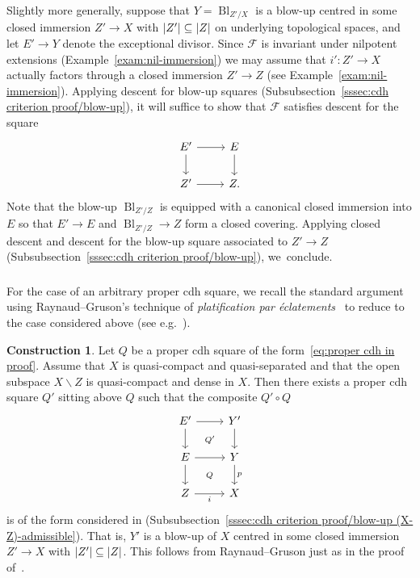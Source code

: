 \documentclass[11pt]{article}
\theoremstyle{definition}
\numberwithin{equation}{section}
\numberwithin{figure}{section}
\numberwithin{table}{section}
\newtheorem{constr}[theo]{Construction}
\DeclarePairedDelimiter\abs{\lvert}{\rvert}
\newcommand{\sF}{\ensuremath{\mathcal{F}}\xspace}
\renewcommand{\setminus}{\smallsetminus}
\DeclareMathOperator{\Bl}{Bl}
\begin{document}
Slightly more generally, suppose that $Y = \Bl_{Z'/X}$ is a blow-up centred in some closed immersion $Z' \to X$ with $\abs{Z'} \subseteq \abs{Z}$ on underlying topological spaces, and let $E' \to Y$ denote the exceptional divisor. Since $\sF$ is invariant under nilpotent extensions (Example~\ref{exam:nil-immersion}) we may assume that $i' : Z' \to X$ actually factors through a closed immersion $Z' \to Z$ (see Example~\ref{exam:nil-immersion}). Applying descent for blow-up squares (Subsubsection~\ref{sssec:cdh criterion proof/blow-up}), it will suffice to show that $\sF$ satisfies descent for the square
\[
\begin{tikzcd}
E' \ar{r}\ar{d} & E \ar{d}
\\
Z' \ar{r} & Z.
\end{tikzcd}
\]
Note that the blow-up $\Bl_{Z'/Z}$ is equipped with a canonical closed immersion into $E$ so that $E' \to E$ and $\Bl_{Z'/Z} \to Z$ form a closed covering. Applying closed descent and descent for the blow-up square associated to $Z' \to Z$ (Subsubsection~\ref{sssec:cdh criterion proof/blow-up}), we~conclude.

\subsubsection{}

For the case of an arbitrary proper cdh square, we recall the standard argument using Raynaud--Gruson's technique of \emph{platification par éclatements}~\cite[I, Corollary~5.7.12]{RaynaudGruson} to reduce to the case considered above (see e.g.~\cite[Subsection~5.2]{KerzStrunkTamme}).

\goodbreak
\begingroup
\begin{constr}\label{constr}
Let $Q$ be a proper cdh square of the form~\eqref{eq:proper cdh in proof}. Assume that $X$ is quasi-compact and quasi-separated and that the open subspace $X\setminus Z$ is quasi-compact and dense in $X$. Then there exists a proper cdh square $Q'$ sitting above $Q$ such that the composite $Q' \circ Q$
\[
\begin{tikzcd}
E' \ar{r}\ar{d}\ar[phantom]{rd}{\scriptstyle Q'} & Y' \ar{d}
\\
E \ar{r}\ar{d}\ar[phantom]{rd}{\scriptstyle Q} & Y \ar{d}{p}
\\
Z \ar[swap]{r}{i} & X
\end{tikzcd}
\]
is of the form considered in (Subsubsection~\ref{sssec:cdh criterion proof/blow-up (X-Z)-admissible}). That is, $Y'$ is a blow-up of $X$ centred in some closed immersion $Z' \to X$ with $\abs{Z'} \subseteq \abs{Z}$. This follows from Raynaud--Gruson just as in the proof of~\cite[Corollary~2.4]{HoyoisKrishna}.
\end{constr}
\endgroup
\end{document}

